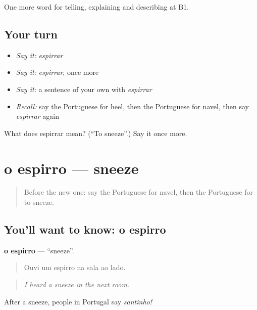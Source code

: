 \begin{grammarlens}[title={What you've built}]
One more word for telling, explaining and describing at B1.
\end{grammarlens}

\subsection*{Your turn}
\begin{itemize}
\raggedright
  \item \emph{Say it:} \emph{espirrar}
  \item \emph{Say it:} \emph{espirrar}, once more
  \item \emph{Say it:} a sentence of your own with \emph{espirrar}
  \item \emph{Recall:} say the Portuguese for heel, then the Portuguese for navel, then say \emph{espirrar} again
\end{itemize}

\begin{tcolorbox}[breakable,colback=teal!4,colframe=teal!35!black,title={Before you move on}]
What does espirrar mean? (\textquotedblleft{}To sneeze\textquotedblright{}.) Say it once more.
\end{tcolorbox}
\section[o espirro]{o espirro — sneeze}

\label{lesson:PT-C483-espirro}



\begin{quote}
Before the new one: say the Portuguese for navel, then the Portuguese for to sneeze.
\end{quote}

\subsection*{You'll want to know: o espirro}
\textbf{o espirro} — \textquotedblleft{}sneeze\textquotedblright{}.

\begin{quote}
Ouvi um espirro na sala ao lado.
\end{quote}

\begin{quote}
\emph{I heard a sneeze in the next room.}
\end{quote}

After a sneeze, people in Portugal say \emph{santinho!}

